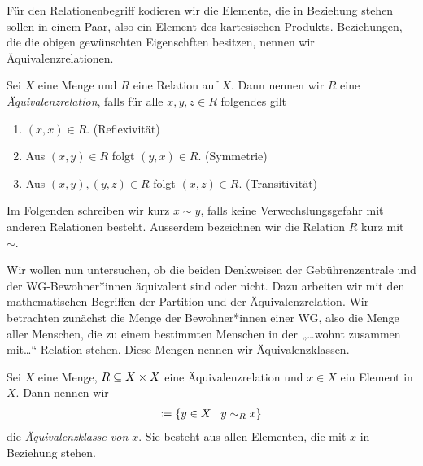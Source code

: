 
Für den Relationenbegriff kodieren wir die Elemente, die in Beziehung
stehen sollen in einem Paar, also ein Element des kartesischen
Produkts. Beziehungen, die die obigen gewünschten Eigenschften besitzen,
nennen wir Äquivalenzrelationen.


\begin{defin}

  Sei $X$ eine Menge und $R$ eine Relation auf $X$. Dann nennen wir $R$
  eine \emph{Äquivalenzrelation}, falls für alle $x,y,z\in R$ folgendes
  gilt
  \begin{enumerate}
    \item $(x,x)\in R$. \hfill (Reflexivität)
    \item Aus $(x,y)\in R$ folgt $(y,x)\in R$. \hfill (Symmetrie)
    \item Aus $(x,y),(y,z)\in R$ folgt $(x,z)\in R$. \hfill (Transitivität)
  \end{enumerate}
    
\end{defin}


Im Folgenden schreiben wir kurz $x\sim y$, falls keine Verwechslungsgefahr
mit anderen Relationen besteht. Ausserdem bezeichnen wir die Relation $R$
kurz mit $\sim$.

Wir wollen nun untersuchen, ob die beiden Denkweisen der Gebührenzentrale
und der WG-Bewohner*innen äquivalent sind oder nicht. Dazu arbeiten wir
mit den mathematischen Begriffen der Partition und der
Äquivalenzrelation. Wir betrachten zunächst die Menge der Bewohner*innen
einer WG, also die Menge aller Menschen, die zu einem bestimmten Menschen
in der „…wohnt zusammen mit…“-Relation stehen. Diese Mengen nennen wir
Äquivalenzklassen.


\begin{defin}

  Sei $X$ eine Menge, $R\subseteq X\times X$ eine Äquivalenzrelation und $x\in
  X$ ein Element in $X$. Dann nennen wir
  \begin{align*}
    [ x ] \ceq \{ y\in X \mid y\sim_{R} x \}
  \end{align*}
  die \emph{Äquivalenzklasse von $x$}. Sie besteht aus allen Elementen, die
  mit $x$ in Beziehung stehen.

\end{defin}



